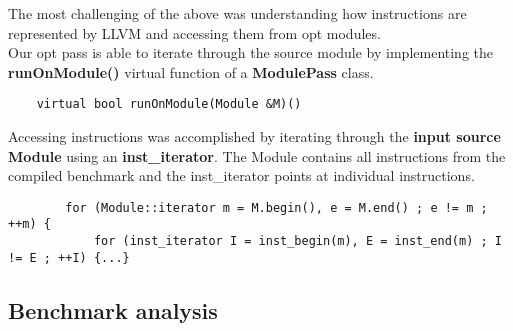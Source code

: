 The most challenging of the above was understanding how instructions are represented by LLVM and accessing them from opt modules.\\

Our opt pass is able to iterate through the source module by implementing the \textbf{runOnModule()} virtual function of a \textbf{ModulePass} class.

\begin{frame}[fragile]
\begin{lstlisting}
    virtual bool runOnModule(Module &M)()
\end{lstlisting}
\end{frame}

Accessing instructions was accomplished by iterating through the \textbf{input source} \textbf{Module} using an \textbf{inst\_iterator}. The Module contains all instructions from the compiled benchmark and the inst\_iterator points at individual instructions.\\

\begin{frame}[fragile]
\begin{lstlisting}
    	for (Module::iterator m = M.begin(), e = M.end() ; e != m ; ++m) {
			for (inst_iterator I = inst_begin(m), E = inst_end(m) ; I != E ; ++I) {...}
\end{lstlisting}
\end{frame}


\subsection{Benchmark analysis}

